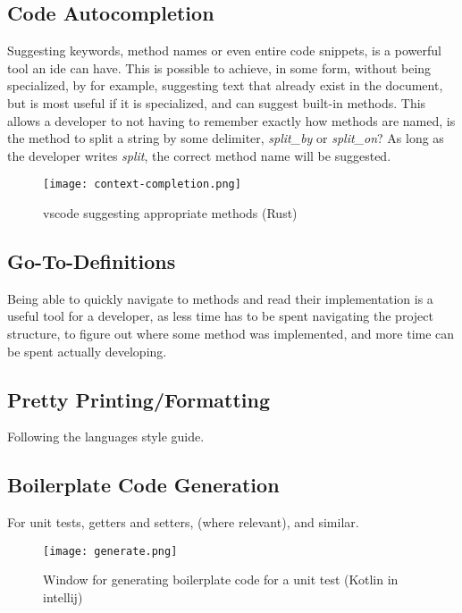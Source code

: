 \subsection{Code Autocompletion}

Suggesting keywords, method names or even entire code snippets, is a powerful
tool an \gls{ide} can have. This is possible to achieve, in some form, without
being specialized, by for example, suggesting text that already exist in the
document, but is most useful if it is specialized, and can suggest built-in
methods. This allows a developer to not having to remember exactly how methods
are named, is the method to split a string by some delimiter, \textit{split\_by}
or \textit{split\_on}? As long as the developer writes \textit{split}, the
correct method name will be suggested.

\begin{figure} \label{pic:completion}
  \centering
  \texttt{[image: context-completion.png]}
  \caption{\gls{vscode} suggesting appropriate methods (Rust)}
\end{figure}

\subsection{Go-To-Definitions}
Being able to quickly navigate to methods and read their implementation is a
useful tool for a developer, as less time has to be spent navigating the project
structure, to figure out where some method was implemented, and more time can be
spent actually developing.

\subsection{Pretty Printing/Formatting}
Following the languages style guide.

\subsection{Boilerplate Code Generation}
For unit tests, getters and setters, (where relevant), and similar.

\begin{figure} \label{pic:generate}
  \centering
  \texttt{[image: generate.png]}
  \caption{Window for generating boilerplate code for a unit test (Kotlin in \gls{intellij})}
\end{figure}

